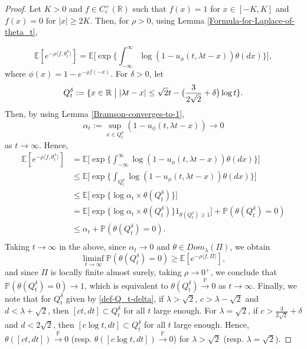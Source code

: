\documentclass[a4paper,reqno]{amsart}%
\newcommand{\1}{\mathbf 1}
\theoremstyle{mine}
\numberwithin{theorem}{section}
\numberwithin{equation}{section}
\theoremstyle{remark}
\begin{document}
\begin{proof}
 Let $K>0$ and $f\in C_c^+(\mathbb{R})$ such that $f(x)=1$ for $x\in [-K,K]$ and $f(x)=0$ for $|x|\geq 2K$. Then, for $\rho >0$, using Lemma \ref{Formula-for-Laplace-of-theta_t}, 

 \begin{equation}\label{Laplace-comp-using-F-KPP-2}
\mathbb{E}[e^{-\rho \langle f,\theta_t^\lambda\rangle}] = \mathbb{E}\biggl[\exp\biggl\{\int_{-\infty}^\infty\log(1- u_\phi(t, \lambda t -x))\theta(dx)\biggr\}\biggr],
\end{equation}
where $\phi(x) = 1 - e^{-\rho f(-x)}$. For $\delta >0$, let 
\begin{equation}\label{def-Q_t-delta}
    Q_t^\delta := \{ x\in \mathbb{R} \hspace{1mm}\bigl | \hspace{1mm} |\lambda t -x| \leq \sqrt{2}t - \bigl(\frac{3}{2\sqrt{2}} + \delta\bigr)\log t\}.
\end{equation} 
Then, by using Lemma \ref{Bramson-converges-to-1}, 
\[\alpha_t := \sup_{x\in Q_t^\delta} (1 - u_\phi(t, \lambda t -x)) \to 0 \] 
as $t\to \infty$. Hence,
\begin{align}
    \mathbb{E}[e^{-\rho \langle f,\theta_t^\lambda\rangle}] &= \mathbb{E}\biggl[\exp\biggl\{\int_{-\infty}^\infty\log(1- u_\phi(t, \lambda t -x))\theta(dx)\biggr\}\biggr] \\ \nonumber 
    & \leq \mathbb{E}\biggl[\exp\biggl\{\int_{Q_t^\delta}\log(1- u_\phi(t, \lambda t -x))\theta(dx)\biggr\}\biggr] \\ \nonumber
    &\leq \mathbb{E}\biggl[\exp\biggl\{\log\alpha_t \times \theta(Q_t^\delta)\biggr\}\biggr] \\ \nonumber
    &= \mathbb{E}\biggl[\exp\biggl\{\log\alpha_t \times \theta(Q_t^\delta)\biggr\} 1_{\theta(Q_t^\delta) \geq 1}\biggr] + \mathbb{P}(\theta(Q_t^\delta) = 0)\\ \nonumber
    &\leq  \alpha_t + \mathbb{P}(\theta(Q_t^\delta) = 0).\\ \nonumber
\end{align}
Taking $t\to \infty$ in the above, since $\alpha_t \to 0$ and $\theta \in Dom_{\lambda}(\Pi)$, we obtain 
\[ \liminf_{t\to \infty} \mathbb{P}(\theta(Q_t^\delta) = 0) \geq  \mathbb{E}[e^{-\rho \langle f,\Pi\rangle}],\]
and since $\Pi$ is locally finite almost surely, taking $\rho \to 0^+$, we conclude that $\mathbb{P}(\theta(Q_t^\delta) = 0) \to 1$, which is equivalent to $\theta(Q_t^\delta) \overset{\mathbb{P}}{\to} 0$ as $t\to \infty$. Finally, we note that for $Q_t^\delta$ given by \eqref{def-Q_t-delta}, if $\lambda >\sqrt{2}$,  $c>\lambda - \sqrt{2}$ and $d<\lambda + \sqrt{2}$, then $[ct, dt] \subset Q_t^\delta $ for all $t$ large enough. For $\lambda = \sqrt{2}$, if $c > \frac{3}{2\sqrt{2}} + \delta$ and $d< 2\sqrt{2}$, then $[c\log t , dt] \subset Q_t^\delta$ for all $t$ large enough. Hence, $\theta([ct, dt]) \overset{\mathbb{P}}{\to} 0 $ (resp. $\theta([c\log t, dt]) \overset{\mathbb{P}}{\to} 0$) for $\lambda >\sqrt{2}$ (resp. $\lambda = \sqrt{2}$). 

\end{proof}
\end{document}
